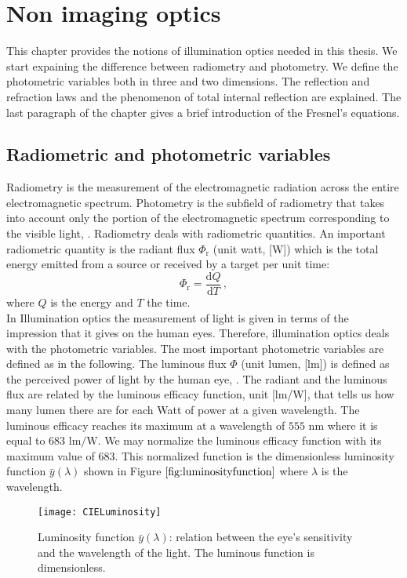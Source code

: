 \chapter{Non imaging optics}
This chapter provides the notions of illumination optics needed in this thesis. We start expaining the difference between radiometry and photometry.
We define the photometric variables  both in three and two dimensions. The reflection and refraction laws and the phenomenon of total internal reflection are explained. The last paragraph of the chapter gives a brief introduction of the Fresnel's equations. 
\section{Radiometric and photometric variables}
Radiometry is the measurement of the electromagnetic radiation across the entire electromagnetic spectrum. Photometry is the subfield of radiometry that takes into account only the portion of the electromagnetic spectrum corresponding to the visible light, \cite{zalewski1995radiometry}. Radiometry  deals with radiometric quantities. An important radiometric quantity  is the radiant flux $\Phi_{\textrm{r}}$ (unit watt, [\textrm{W}]) which is the total energy emitted from a source or received by a target per unit time:
\begin{equation}
\Phi_{\textrm{r}} = \frac{\textrm{d}Q}{\textrm{d}T}\,,
\end{equation}
where $Q$ is the energy and $T$ the time.\\
\indent In Illumination optics the measurement of light is given in terms of the impression that it gives on the human eyes. Therefore, illumination optics deals with the photometric variables. The most important photometric variables are defined as in the following. The luminous flux $\Phi$ (unit lumen, [\textrm{lm}]) is defined as the perceived power of light by the human eye, \cite{chaves2015introduction}.
 The radiant and the luminous flux are related by the luminous efficacy function, unit [lm/W], that tells us how many lumen there are for each Watt of power at a given wavelength.
 The luminous efficacy reaches its maximum  at a wavelength of $555$ $\textrm{nm}$ where it is equal to $683$ $\textrm{lm}/\textrm{W}$.
  We may normalize the luminous efficacy function with its maximum value of $683$.
  This normalized function is the dimensionless luminosity function $\bar{y}(\lambda)$ shown in Figure $\ref{fig:luminosityfunction}$ where $\lambda$ is the wavelength.
\begin{figure}[htbp]
  \begin{center}
  \texttt{[image: CIELuminosity]}
  \end{center}
  \caption{Luminosity function $\bar{y}(\lambda)$: relation between the eye's sensitivity and the wavelength of the light. The luminous function is dimensionless.}
  \label{fig:luminosityfunction}
  \end{figure}
